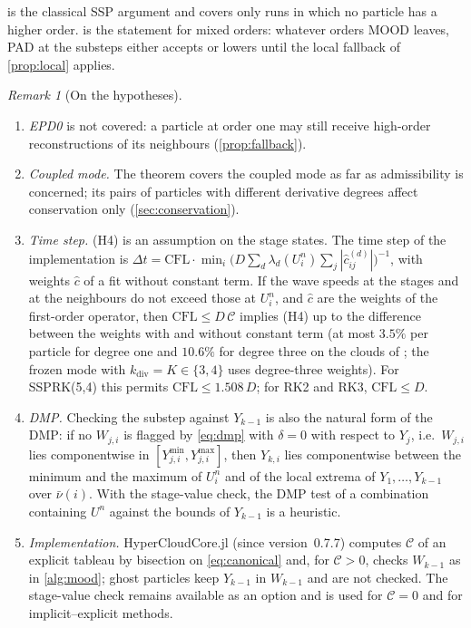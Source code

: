 \documentclass[11pt,a4paper]{article}
\theoremstyle{plain}
\theoremstyle{definition}
\theoremstyle{remark}
\newtheorem{remark}[theorem]{Remark}
\numberwithin{equation}{section}
\newcommand{\cnb}{\bar\nu}
\newcommand{\CFL}{\mathrm{CFL}}
\newcommand{\Csp}{\mathcal{C}}
\begin{document}
 is the classical SSP argument and covers only runs in which no particle has a higher order.  is the statement for mixed orders: whatever orders MOOD leaves, PAD at the substeps either accepts or lowers until the local fallback of \cref{prop:local} applies.

\begin{remark}[On the hypotheses]\label{rem:mood}
\begin{enumerate}[label=(\roman*)]
\item \emph{EPD0} is not covered: a particle at order one may still receive high-order reconstructions of its neighbours (\cref{prop:fallback}).
\item \emph{Coupled mode.} The theorem covers the coupled mode as far as admissibility is concerned; its pairs of particles with different derivative degrees affect conservation only (\cref{sec:conservation}).
\item \emph{Time step.} (H4) is an assumption on the stage states. The time step of the implementation is $\Delta t=\CFL\cdot\min_i\big(D\sum_d\lambda_d(U^n_i)\sum_j|\hat c^{(d)}_{ij}|\big)^{-1}$, with weights $\hat c$ of a fit without constant term. If the wave speeds at the stages and at the neighbours do not exceed those at $U^n_i$, and $\hat c$ are the weights of the first-order operator, then $\CFL\le D\,\Csp$ implies (H4) up to the difference between the weights with and without constant term (at most $3.5\%$ per particle for degree one and $10.6\%$ for degree three on the clouds of \cite{JungMUSCL2026}; the frozen mode with $k_{\mathrm{div}}=K\in\{3,4\}$ uses degree-three weights). For SSPRK(5,4) this permits $\CFL\le1.508\,D$; for RK2 and RK3, $\CFL\le D$.
\item \emph{DMP.} Checking the substep against $Y_{k-1}$ is also the natural form of the DMP: if no $W_{j,i}$ is flagged by \eqref{eq:dmp} with $\delta=0$ with respect to $Y_j$, i.e.\ $W_{j,i}$ lies componentwise in $[Y^{\min}_{j,i},Y^{\max}_{j,i}]$, then $Y_{k,i}$ lies componentwise between the minimum and the maximum of $U^n_i$ and of the local extrema of $Y_1,\dots,Y_{k-1}$ over $\cnb(i)$. With the stage-value check, the DMP test of a combination containing $U^n$ against the bounds of $Y_{k-1}$ is a heuristic.
\item \emph{Implementation.} HyperCloudCore.jl (since version~0.7.7) computes $\Csp$ of an explicit tableau by bisection on \eqref{eq:canonical} and, for $\Csp>0$, checks $W_{k-1}$ as in \cref{alg:mood}; ghost particles keep $Y_{k-1}$ in $W_{k-1}$ and are not checked. The stage-value check remains available as an option and is used for $\Csp=0$ and for implicit--explicit methods.
\end{enumerate}
\end{remark}
\end{document}
